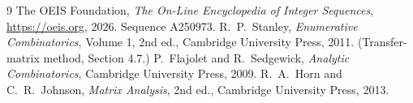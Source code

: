 \documentclass[11pt,a4paper]{article}
\theoremstyle{plain}
\theoremstyle{definition}
\begin{document}
\begin{thebibliography}{9}
 The OEIS Foundation, \emph{The On-Line Encyclopedia of Integer
Sequences}, \url{https://oeis.org}, 2026. Sequence A250973.
 R.~P.~Stanley, \emph{Enumerative Combinatorics}, Volume 1, 2nd ed.,
Cambridge University Press, 2011. (Transfer-matrix method, Section 4.7.)
 P.~Flajolet and R.~Sedgewick, \emph{Analytic Combinatorics}, Cambridge
University Press, 2009.
 R.~A.~Horn and C.~R.~Johnson, \emph{Matrix Analysis}, 2nd ed., Cambridge
University Press, 2013.
\end{thebibliography}
\end{document}
